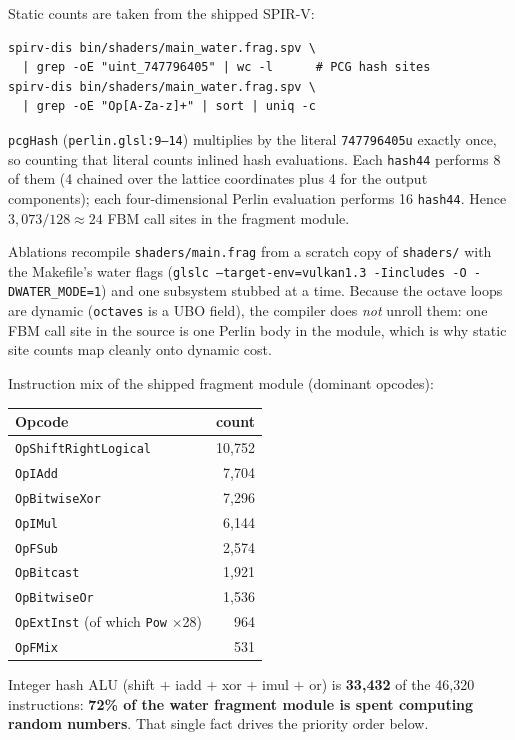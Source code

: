 \documentclass[11pt,a4paper]{article}
\begin{document}
Static counts are taken from the shipped SPIR-V:

{\small
\begin{verbatim}
spirv-dis bin/shaders/main_water.frag.spv \
  | grep -oE "uint_747796405" | wc -l      # PCG hash sites
spirv-dis bin/shaders/main_water.frag.spv \
  | grep -oE "Op[A-Za-z]+" | sort | uniq -c
\end{verbatim}
}

\texttt{pcgHash} (\texttt{perlin.glsl:9--14}) multiplies by the literal \texttt{747796405u} exactly once, so counting that
literal counts inlined hash evaluations. Each \texttt{hash44} performs 8 of them (4 chained over the lattice coordinates
plus 4 for the output components); each four-dimensional Perlin evaluation performs 16 \texttt{hash44}. Hence
$3{,}073 / 128 \approx 24$ FBM call sites in the fragment module.

Ablations recompile \texttt{shaders/main.frag} from a scratch copy of \texttt{shaders/} with the Makefile's water flags
(\texttt{glslc --target-env=vulkan1.3 -Iincludes -O -DWATER\_MODE=1}) and one subsystem stubbed at a time. Because the
octave loops are dynamic (\texttt{octaves} is a UBO field), the compiler does \emph{not} unroll them: one FBM call site
in the source is one Perlin body in the module, which is why static site counts map cleanly onto dynamic cost.

Instruction mix of the shipped fragment module (dominant opcodes):

\begin{center}
\small
\begin{tabular}{@{}lr@{}}
\toprule
Opcode & count \\
\midrule
\texttt{OpShiftRightLogical} & 10,752 \\
\texttt{OpIAdd} & 7,704 \\
\texttt{OpBitwiseXor} & 7,296 \\
\texttt{OpIMul} & 6,144 \\
\texttt{OpFSub} & 2,574 \\
\texttt{OpBitcast} & 1,921 \\
\texttt{OpBitwiseOr} & 1,536 \\
\texttt{OpExtInst} (of which \texttt{Pow} $\times$28) & 964 \\
\texttt{OpFMix} & 531 \\
\bottomrule
\end{tabular}
\end{center}

Integer hash ALU (shift $+$ iadd $+$ xor $+$ imul $+$ or) is \textbf{33,432} of the 46,320 instructions: \textbf{72\% of
the water fragment module is spent computing random numbers}. That single fact drives the priority order below.
\end{document}
